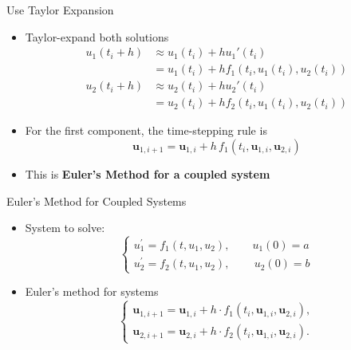\documentclass[10pt]{beamer}
\begin{document}
\begin{frame}{Use Taylor Expansion}


\begin{itemize}
    \item Taylor-expand both solutions
    \begin{align*}        
    u_1(t_i+h) &\approx u_1(t_i) + h u_1'(t_i) \\
           &= u_1(t_i) + h f_1(t_i, u_1(t_i),u_2(t_i))\\[3mm]
    u_2(t_i+h) &\approx u_2(t_i) + h u_2'(t_i) \\
           &= u_2(t_i) + h f_2(t_i, u_1(t_i),u_2(t_i))
    \end{align*}

    \item For the first component, the time-stepping rule is
        $$
        \textbf{u}_{1,i+1} = \textbf{u}_{1,i} + h\,f_1(t_i, \textbf{u}_{1,i},\textbf{u}_{2,i} )
        $$
    \item This is \textbf{Euler's Method for a coupled system}
\end{itemize}

\end{frame}
\begin{frame}{Euler's Method for Coupled Systems}
\begin{itemize}
    \item System to solve:
    \[
    \begin{cases}
    u_1^\prime = f_1(t,u_1,u_2), \qquad u_1(0) = a \\
    u_2^\prime = f_2(t,u_1,u_2), \quad \quad \, u_2(0) = b
    \end{cases}
    \]

    \item Euler's method for systems
    \[
    \begin{cases}
    \textbf{u}_{1,i+1} = \textbf{u}_{1,i} + h \cdot f_1(t_i, \textbf{u}_{1,i}, \textbf{u}_{2,i}), \\
    \textbf{u}_{2,i+1} = \textbf{u}_{2,i} + h \cdot f_2(t_i, \textbf{u}_{1,i}, \textbf{u}_{2,i}).
    \end{cases}
    \]


\end{itemize}
\end{frame}


\end{document}
